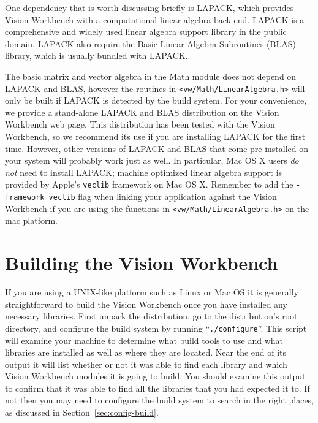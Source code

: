 One dependency that is worth discussing briefly is LAPACK, which
provides Vision Workbench with a computational linear algebra back
end.  LAPACK is a comprehensive and widely used linear algebra support
library in the public domain.  LAPACK also require the Basic Linear
Algebra Subroutines (BLAS) library, which is usually bundled with
LAPACK.

The basic matrix and vector algebra in the Math module does not depend
on LAPACK and BLAS, however the routines in
\verb#<vw/Math/LinearAlgebra.h># will only be built if LAPACK is
detected by the build system.  For your convenience, we provide a
stand-alone LAPACK and BLAS distribution on the Vision Workbench web
page.  This distribution has been tested with the Vision Workbench, so
we recommend its use if you are installing LAPACK for the first time.
However, other versions of LAPACK and BLAS that come pre-installed on
your system will probably work just as well.  In particular, Mac OS X
users {\em do not} need to install LAPACK; machine optimized linear
algebra support is provided by Apple's \verb#veclib# framework on Mac
OS X.  Remember to add the \verb#-framework veclib# flag when linking
your application against the Vision Workbench if you are using the
functions in \verb#<vw/Math/LinearAlgebra.h># on the mac platform.

\section{Building the Vision Workbench}

If you are using a UNIX-like platform such as Linux or Mac OS it is
generally straightforward to build the Vision Workbench once you have
installed any necessary libraries.  First unpack the distribution, go
to the distribution's root directory, and configure the build system
by running ``\verb#./configure#''.  This script will examine your machine
to determine what build tools to use and what libraries are installed
as well as where they are located.  Near the end of its output it will
list whether or not it was able to find each library and which Vision
Workbench modules it is going to build.  You should examine this
output to confirm that it was able to find all the libraries that you
had expected it to.  If not then you may need to configure the build
system to search in the right places, as discussed in
Section~\ref{sec:config-build}.

